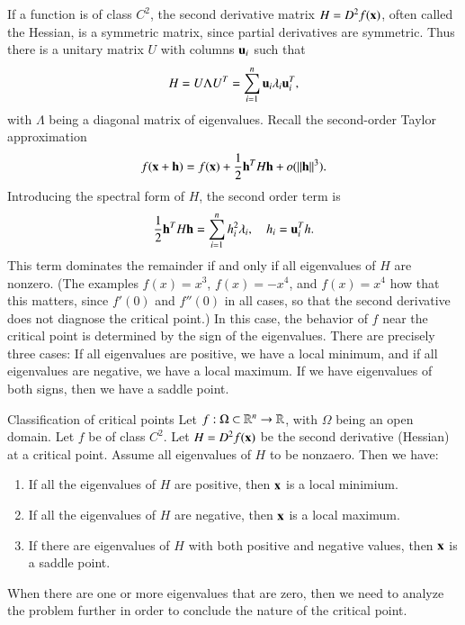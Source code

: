 If a function is of class $C^2$, the second derivative matrix $H = D^2 f(\mathbf{x})$, often called the Hessian, is a symmetric matrix, since partial derivatives are symmetric. Thus there is a unitary matrix $U$ with columns $\mathbf{u}_i$ such that
\begin{equation}
    H = U\Lambda U^T = \sum_{i=1}^n \mathbf{u}_i \lambda_i \mathbf{u}_i^T,
\end{equation}
with $\Lambda$ being a diagonal matrix of eigenvalues.
Recall the second-order Taylor approximation
\begin{equation}
    f(\mathbf{x} + \mathbf{h}) = f(\mathbf{x}) + \frac{1}{2} \mathbf{h}^T H \mathbf{h} + o(\|\mathbf{h}\|^3).
\end{equation}
Introducing the spectral form of $H$, the second order term is
\begin{equation}
    \frac{1}{2} \mathbf{h}^T H \mathbf{h} = \sum_{i=1}^n h_i^2 \lambda_i, \quad h_i = \mathbf{u}_i^T h.
\end{equation}
This term dominates the remainder if and only if all eigenvalues of $H$ are nonzero. (The examples $f(x) = x^3$, $f(x) = -x^4$, and $f(x) = x^4$ how that this matters, since $f'(0)$ and $f''(0)$ in all cases, so that the second derivative does not diagnose the critical point.)
In this case, the behavior of $f$ near the critical point is determined by the sign of the eigenvalues. There are precisely three cases: If all eigenvalues are positive, we have a local minimum, and if all eigenvalues are negative, we have a local maximum. If we have eigenvalues of both signs, then we have a saddle point. 
\begin{myTheorem}{Classification of critical points} 
Let
$f : \Omega \subset \mathbb{R}^n \to \mathbb{R}$, with $\Omega$ being an open domain. Let $f$ be of class $C^2$. Let $H = D^2f(\mathbf{x})$ be the second derivative (Hessian) at a critical point. Assume all eigenvalues of $H$ to be nonzaero.
Then we have:
\begin{enumerate}
    \item
     If all the eigenvalues of $H$ are positive, then $\mathbf{x}$ is a local minimium.
     \item
     If all the eigenvalues of $H$ are negative, then $\mathbf{x}$ is a local maximum.
     \item If there are eigenvalues of $H$ with both positive and negative values, then $\mathbf{x}$ is a saddle point.
\end{enumerate}
\end{myTheorem}

When there are one or more eigenvalues that are zero, then we need to analyze the problem further in order to conclude the nature of the critical point.




